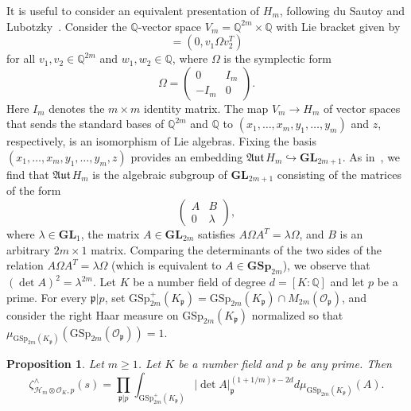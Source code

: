 \documentclass[11pt,a4paper]{amsart}
\theoremstyle{plain}
\newtheorem{pro}[thm]{Proposition}
\theoremstyle{remark}
\newcommand{\Q}{\mathbb{Q}}
\newcommand{\tensor}{\otimes}
\newcommand{\p}{\mathfrak{p}}
\def \aAut {\mathfrak{Aut} \,}
\def \p {\ensuremath{\mathfrak{p}}}
\begin{document}
It is useful to consider an equivalent presentation of $H_m$, following du Sautoy and Lubotzky~\cite[Section 3.3]{duSLubotzky/96}.  Consider the $\Q$-vector space $V_m = \Q^{2m} \times \Q$ with Lie bracket given by
\begin{equation*}
[ (v_1, w_1), (v_2, w_2)] = (0, v_1 \Omega v_2^T)
\end{equation*}
for all $v_1, v_2 \in \Q^{2m}$ and $w_1, w_2 \in \Q$, where $\Omega$ is the symplectic form 
\begin{equation*}
\Omega = \left( \begin{array}{cc} 0 & I_m \\ - I_m & 0 \end{array} \right).
\end{equation*}
Here $I_m$ denotes the $m \times m$ identity matrix.  The map $V_m \to H_m$ of vector spaces that sends the standard bases of $\Q^{2m}$ and $\Q$ to $(x_1, \dots, x_m, y_1, \dots, y_m)$ and $z$, respectively, is an isomorphism of Lie algebras.  Fixing the basis $(x_1, \dots, x_m, y_1, \dots, y_m, z)$ provides an embedding $\aAut H_m \hookrightarrow \mathbf{GL}_{2m + 1}$.
As in~\cite[Lemma 3.12]{duSLubotzky/96}, we find that $\aAut H_m$ is the algebraic subgroup of $\mathbf{GL}_{2m+1}$ consisting of the matrices of the form
\begin{equation*} \label{equ:amalgam}
\left( \begin{array}{cc} A & B \\ 0 & \lambda \end{array} \right),
\end{equation*}
where $\lambda \in \mathbf{GL}_1$, the matrix $A \in \mathbf{GL}_{2m}$ satisfies $A \Omega A^T = \lambda \Omega$, and $B$ is an arbitrary $2m \times 1$ matrix.  Comparing the determinants of the two sides of the relation $A \Omega A^T = \lambda \Omega$ (which is equivalent to $A \in \mathbf{GSp}_{2m}$), we observe that $(\det A)^2 = \lambda^{2m}$.  
Let $K$ be a number field of degree $d = [K:\Q]$ and let $p$ be a prime.  For every $\p | p$, set $\mathrm{GSp}_{2m}^+(K_\p) = \mathrm{GSp}_{2m}(K_\p) \cap M_{2m}(\mathcal{O}_{\p})$, and consider the right Haar measure on $\mathrm{GSp}_{2m}(K_\p)$ normalized so that $\mu_{\mathrm{GSp}_{2m}(K_\p)}(\mathrm{GSp}_{2m}(\mathcal{O}_{\p})) = 1$. 
\begin{pro} \label{thm:gsp}
Let $m \geq 1$.  Let $K$ be a number field and $p$ be any prime.  Then
\begin{equation*}
\zeta^\wedge_{\mathcal{H}_m \tensor \mathcal{O}_K,p}(s) = \prod_{\p | p} \int_{\mathrm{GSp}_{2m}^+(K_\p)} | \det A |_{\p}^{(1 + 1/m)s - 2d} d \mu_{\mathrm{GSp}_{2m}(K_\p)}(A).
\end{equation*}
\end{pro}
\end{document}
